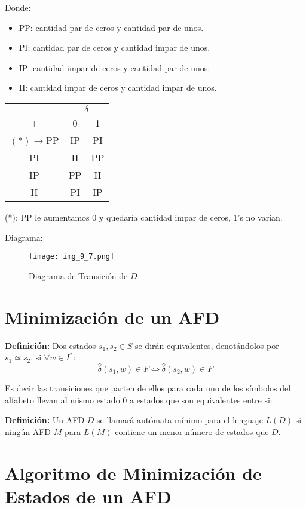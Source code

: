Donde:
\begin{itemize}
\item PP: cantidad par de ceros y cantidad par de unos.
\item PI: cantidad par de ceros y cantidad impar de unos.
\item IP: cantidad impar de ceros y cantidad par de unos.
\item II: cantidad impar de ceros y cantidad impar de unos.
\end{itemize}

\begin{center}
\begin{tabular}{c|cc}
	&\multicolumn{2}{c}{$\delta$}\\
+	&0	&1	\\ \hline
$(*)\rightarrow$PP	&IP	&PI	\\
PI	&II	&PP	\\
IP	&PP	&II	\\
II	&PI	&IP	
\end{tabular}
\end{center}
(*): PP le aumentamos $0$ y quedaría cantidad impar de ceros, 1's no varían.

Diagrama:

\begin{figure}[h!]
\centering
\texttt{[image: img\_9\_7.png]}
\caption{Diagrama de Transición de $D$}\label{img_9_7}
\end{figure}

\section{Minimización de un AFD}

\textbf{Definición: }Dos estados $s_1,s_2\in S$ se dirán equivalentes, denotándolos por $s_1\simeq s_2$, si $\forall w\in I^*$:
$$\widehat{\delta}(s_1,w)\in F \Leftrightarrow \widehat{\delta}(s_2,w)\in F$$

Es decir las transiciones que parten de ellos para cada uno de los símbolos del alfabeto llevan al mismo estado $0$ a estados que son equivalentes entre si:

\textbf{Definición: }Un AFD $D$ se llamará autómata mínimo para el lenguaje $L(D)$ si ningún AFD $M$ para $L(M)$ contiene un menor número de estados que $D$.

\section{Algoritmo de Minimización de Estados de un AFD}

